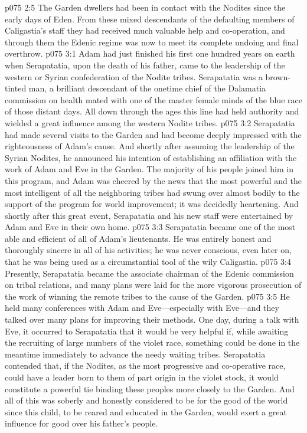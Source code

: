 \vs p075 2:5 The Garden dwellers had been in contact with the Nodites since the early days of Eden. From these mixed descendants of the defaulting members of Caligastia’s staff they had received much valuable help and co\hyp{}operation, and through them the Edenic regime was now to meet its complete undoing and final overthrow.
\vs p075 3:1 Adam had just finished his first one hundred years on earth when Serapatatia, upon the death of his father, came to the leadership of the western or Syrian confederation of the Nodite tribes. Serapatatia was a brown\hyp{}tinted man, a brilliant descendant of the onetime chief of the Dalamatia commission on health mated with one of the master female minds of the blue race of those distant days. All down through the ages this line had held authority and wielded a great influence among the western Nodite tribes.
\vs p075 3:2 Serapatatia had made several visits to the Garden and had become deeply impressed with the righteousness of Adam’s cause. And shortly after assuming the leadership of the Syrian Nodites, he announced his intention of establishing an affiliation with the work of Adam and Eve in the Garden. The majority of his people joined him in this program, and Adam was cheered by the news that the most powerful and the most intelligent of all the neighboring tribes had swung over almost bodily to the support of the program for world improvement; it was decidedly heartening. And shortly after this great event, Serapatatia and his new staff were entertained by Adam and Eve in their own home.
\pc \vs p075 3:3 Serapatatia became one of the most able and efficient of all of Adam’s lieutenants. He was entirely honest and thoroughly sincere in all of his activities; he was never conscious, even later on, that he was being used as a circumstantial tool of the wily Caligastia.
\pc \vs p075 3:4 Presently, Serapatatia became the associate chairman of the Edenic commission on tribal relations, and many plans were laid for the more vigorous prosecution of the work of winning the remote tribes to the cause of the Garden.
\vs p075 3:5 He held many conferences with Adam and Eve---especially with Eve---and they talked over many plans for improving their methods. One day, during a talk with Eve, it occurred to Serapatatia that it would be very helpful if, while awaiting the recruiting of large numbers of the violet race, something could be done in the meantime immediately to advance the needy waiting tribes. Serapatatia contended that, if the Nodites, as the most progressive and co\hyp{}operative race, could have a leader born to them of part origin in the violet stock, it would constitute a powerful tie binding these peoples more closely to the Garden. And all of this was soberly and honestly considered to be for the good of the world since this child, to be reared and educated in the Garden, would exert a great influence for good over his father’s people.
